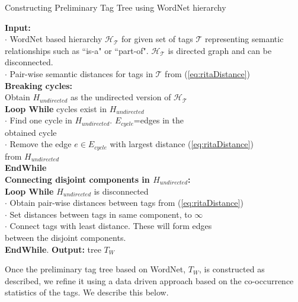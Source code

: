 \begin{algorithm}
\fontsize{8pt}{1em}\selectfont
\caption{Constructing Preliminary Tag Tree using WordNet hierarchy} 
\label{alg:WordNetSTAlgo} 
\textbf{Input:} \\
$\cdot$ WordNet based hierarchy $\mathcal{H_T}$ for given set of tags $\mathcal{T}$ representing semantic relationships such as ``is-a" or ``part-of". $\mathcal{H_T}$ is directed graph and can be disconnected. \\ 
$\cdot$ Pair-wise semantic distances for tags in $\mathcal{T}$ from (\ref{eq:ritaDistance})\\
\textbf{Breaking cycles:} \\
Obtain $H_{undirected}$ as the undirected version of $\mathcal{H_T}$ \\
\textbf{Loop While} cycles exist in $H_{undirected}$ \\
\hspace*{5mm} $\cdot$ Find one cycle in $H_{undirected}$. $E_{cycle}$=edges in the \\
\hspace*{5mm} \; obtained cycle \\
\hspace*{5mm} $\cdot$ Remove the edge $e \in E_{cycle}$ with largest distance (\ref{eq:ritaDistance}) \\
\hspace*{5mm}  \; from $H_{undirected}$ \\
\textbf{EndWhile} \\
\textbf{Connecting disjoint components in $H_{undirected}$:} \\ 
\textbf{Loop While}  $H_{undirected}$ is disconnected \\
\hspace*{5mm} $\cdot$ Obtain pair-wise distances between tags from (\ref{eq:ritaDistance}) \\
\hspace*{5mm} $\cdot$ Set distances between tags in same component, to $\infty$ \\
\hspace*{5mm} $\cdot$ Connect tags with least distance. These will form edges \\
\hspace*{5mm} between the disjoint components. \\
\textbf{EndWhile}. \textbf{Output:}  tree $T_W$ 
\end{algorithm}
Once the preliminary tag tree based on WordNet, $T_W$, is constructed as described, we refine it using a data driven approach based on the co-occurrence statistics of the tags. We describe this below. 

